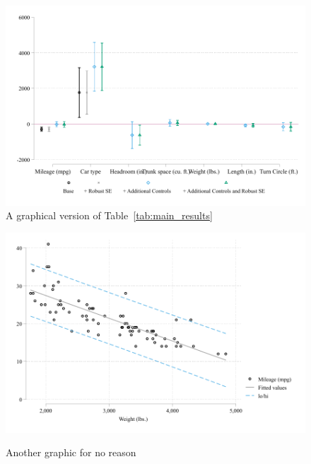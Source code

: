 \documentclass[12pt]{article}%
\begin{document}
\begin{figure}[h]
	\caption[Coefficient Plot]{A graphical version of Table~\ref{tab:main_results}}
	  \centering
	  \includegraphics[width=\linewidth]{../output/coef_plot.pdf}

	\label{fig:coef_plot}
\end{figure}
\begin{figure}[h]
	\caption[Alternative Regression Plot]{Another graphic for no reason}
	  \centering
	  \includegraphics[width=\linewidth]{../output/regression_plot.pdf}
	\label{fig:altertive_regression}
\end{figure}


 \FloatBarrier
\end{document}
